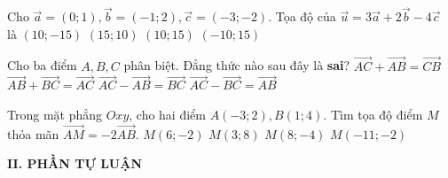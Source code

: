 \begin{ex}%
Cho $\overrightarrow{a}=(0;1),\overrightarrow{b}=(-1;2),\overrightarrow{c}=(-3;-2)$. Tọa độ của $\overrightarrow{u}=3\overrightarrow{a}+2\overrightarrow{b}-4\overrightarrow{c}$ là
\choice
{$(10;-15)$}
{$(15;10)$}
{\True $(10;15)$}
{$(-10;15)$}
\end{ex}
\begin{ex}%
Cho ba điểm $A,B,C$ phân biệt. Đẳng thức nào sau đây là \textbf{sai}?
\choice
{\True $\overrightarrow{AC}+\overrightarrow{AB}=\overrightarrow{CB}$}
{$\overrightarrow{AB}+\overrightarrow{BC}=\overrightarrow{AC}$}
{$\overrightarrow{AC}-\overrightarrow{AB}=\overrightarrow{BC}$}
{$\overrightarrow{AC}-\overrightarrow{BC}=\overrightarrow{AB}$}
\end{ex}
\begin{ex}%
Trong mặt phẳng $Oxy$, cho hai điểm $A(-3;2),B(1;4)$. Tìm tọa độ điểm $M$ thỏa mãn $\overrightarrow{AM}=-2\overrightarrow{AB}$.
\choice
{$M(6;-2)$}
{$M(3;8)$}
{$M(8;-4)$}
{\True $M(-11;-2)$}
\end{ex}
\noindent\textbf{II. PHẦN TỰ LUẬN}
